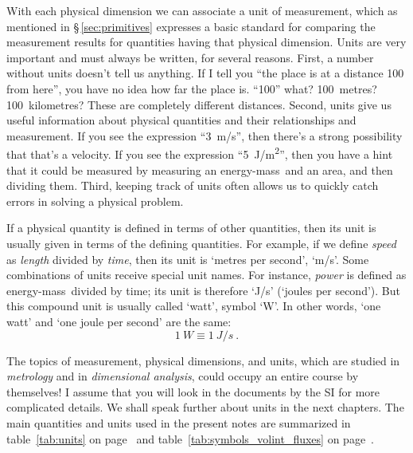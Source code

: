 \documentclass[a4paper,12pt,%
onecolumn,oneside,%
british%
]{memoir}
\providecommand{\href}[2]{#2}
\renewcommand*{\|}[1][]{\nonscript\:#1\vert\nonscript\:\mathopen{}}
\newcommand*{\sect}{\S}%
\newcommand*{\furl}[2]{\href{#1}{#2}\pagenote{\url{#1}}}
\newcommand*{\energym}{energy-mass}
\begin{document}
With each physical dimension we can associate a unit of measurement, which as mentioned in \sect\,\ref{sec:primitives} expresses a basic standard for comparing the measurement results for quantities having that physical dimension. Units are very important and must always be written, for several reasons. First, a number without units doesn't tell us anything. If I tell you \enquote{the place is at a distance 100 from here}, you have no idea how far the place is. \enquote{100} what? 100~metres? 100~kilometres? These are completely different distances. Second, units give us useful information about physical quantities and their relationships and measurement. If you see the expression \enquote{\qty{3}{m/s}}, then there's a strong possibility that that's a velocity. If you see the expression \enquote{\qty{5}{J/m^2}}, then you have a hint that it could be measured by measuring an \energym\ and an area, and then dividing them. Third, keeping track of units often allows us to quickly catch errors in solving a physical problem.


If a physical quantity is defined in terms of other quantities, then its unit is usually given in terms of the defining quantities. For example, if we define \emph{speed} as \emph{length} divided by \emph{time}, then its unit is \enquote*{metres per second}, \enquote*{\unit{m/s}}. Some combinations of units receive special unit names. For instance, \emph{power} is defined as \energym\ divided by time; its unit is therefore \enquote*{\unit{J/s}} (\enquote*{joules per second}). But this compound unit is usually called \enquote*{watt}, symbol \enquote*{\unit{W}}. In other words, \enquote*{one watt} and \enquote*{one joule per second} are the same:
\begin{equation*}
  \qty{1}{W} \equiv \qty{1}{J/s} \ .
\end{equation*}

The topics of measurement, physical dimensions, and units, which are studied in \emph{metrology} and in \emph{dimensional analysis}, could occupy an entire course by themselves! I assume that you will look in the documents by the SI for more complicated details. We shall speak further about units in the next chapters. The main quantities and units used in the present notes are summarized in table~\ref{tab:units} on page~\pageref{tab:units} and table~\ref{tab:symbols_volint_fluxes} on page~\pageref{tab:symbols_volint_fluxes}.
\end{document}
